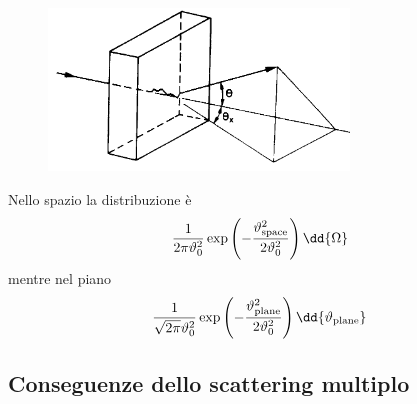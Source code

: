 \begin{minipage}{0.595\textwidth}
    \begin{figure}[H]
        \centering
        \includegraphics[width=8cm]{immagini/distribuzione_angolare_di_scattering.png}
    \end{figure}
\end{minipage}
\begin{minipage}{0.4\textwidth}
    \vspace{0.4cm}Nello spazio la distribuzione è
    \begin{equation*}
        \frac{1}{2 \pi \vartheta_0^2}\exp \left(-\frac{\vartheta_{\rm space}^2}{2\vartheta_0^2}\right) \dd{\Omega}
    \end{equation*}
    mentre nel piano
    \begin{equation*}
        \frac{1}{\sqrt{2 \pi} \vartheta_0^2}\exp \left(-\frac{\vartheta_{\rm plane}^2}{2\vartheta_0^2}\right) \dd{\vartheta_{\rm plane}}
    \end{equation*}
\end{minipage}

\subsection{Conseguenze dello scattering multiplo}

